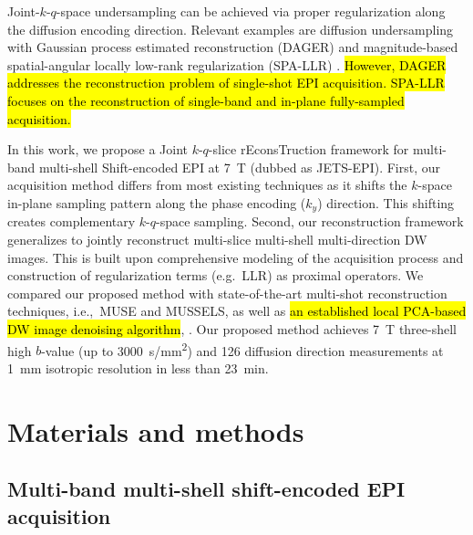 \documentclass[preprint,12pt,authoryear,review]{elsarticle}
\begin{document}
    Joint-$k$-$q$-space undersampling can be achieved via proper regularization
    along the diffusion encoding direction.
    Relevant examples are
    diffusion undersampling with Gaussian process estimated reconstruction (DAGER)
    \citep{wu_2019_dager} and magnitude-based spatial-angular locally low-rank regularization
    (SPA-LLR) \citep{hu_2020_spa_llr}.
    \hl{However, DAGER addresses the reconstruction problem
    of single-shot EPI acquisition.
    SPA-LLR focuses on the reconstruction
    of single-band and in-plane fully-sampled acquisition.}

    In this work, we propose a Joint $k$-$q$-slice rEconsTruction framework
    for multi-band multi-shell Shift-encoded EPI at \SI{7}{\tesla}
    (dubbed as JETS-EPI).
    First, our acquisition method differs from most existing techniques
    as it shifts the $k$-space in-plane sampling pattern
    along the phase encoding ($k_y$) direction.
    This shifting creates complementary $k$-$q$-space sampling.
    Second, our reconstruction framework generalizes to
    jointly reconstruct multi-slice multi-shell multi-direction DW images.
    This is built upon comprehensive modeling of the acquisition process
    and construction of regularization terms (e.g.~LLR) as proximal operators.
    We compared our proposed method with
    state-of-the-art multi-shot reconstruction techniques,
    i.e.,~MUSE and MUSSELS,
    as well as
    \hl{an established local PCA-based DW image denoising algorithm},
    \citep{manjon_2013_localpca,veraart_2016_denoise}.
    Our proposed method achieves \SI{7}{\tesla}
    three-shell high $b$-value (up to \SI{3000}{s/mm^2})
    and 126 diffusion direction measurements
    at \SI{1}{mm} isotropic resolution in less than \SI{23}{min}.

    \clearpage

    \section{Materials and methods}
    \label{SEC:Meth}

    \subsection{Multi-band multi-shell shift-encoded EPI acquisition}
\end{document}
